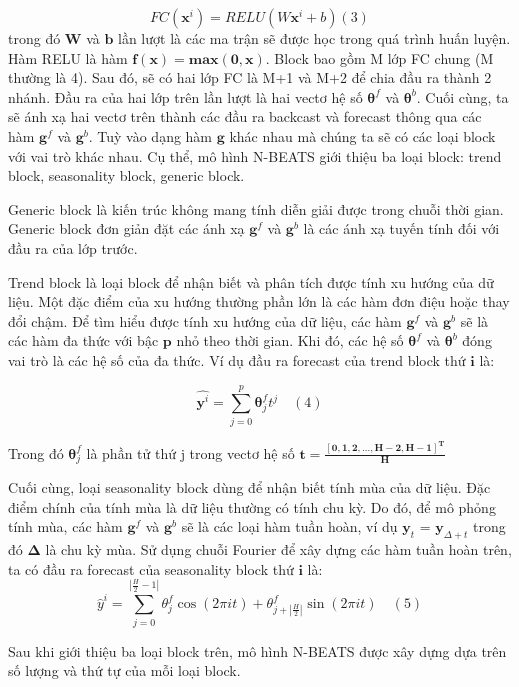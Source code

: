 \documentclass[conference]{IEEEtran}
\begin{document}
\[
    FC(\mathbf{x}^i) = RELU(W\mathbf{x}^i + b) (3)
\]
trong đó $\mathbf{W}$ và $\mathbf{b}$ lần lượt là các ma trận sẽ được học trong quá trình huấn luyện. Hàm RELU là hàm $\mathbf{f(x) = max(0, x)}$.
Block bao gồm M lớp FC chung (M thường là 4). Sau đó, sẽ có hai lớp FC là M+1 và M+2 để chia đầu ra thành 2 nhánh. Đầu ra của hai lớp trên lần lượt là hai vectơ hệ số $\mathbf{\theta}^f$ và $\mathbf{\theta}^b$.
Cuối cùng, ta sẽ ánh xạ hai vectơ trên thành các đầu ra backcast và forecast thông qua các hàm $\mathbf{g}^f$ và $\mathbf{g}^b$. Tuỳ vào dạng hàm $\mathbf{g}$ khác nhau mà chúng ta sẽ có các loại block với vai trò khác nhau. Cụ thể, mô hình N-BEATS giới thiệu ba loại block: trend block, seasonality block, generic block.

Generic block là kiến trúc không mang tính diễn giải được trong chuỗi thời gian. Generic block đơn giản đặt các ánh xạ $\mathbf{g}^f$ và $\mathbf{g}^b$ là các ánh xạ tuyến tính đối với đầu ra của lớp trước.

Trend block là loại block để nhận biết và phân tích được tính xu hướng của dữ liệu. Một đặc điểm của xu hướng thường phần lớn là các hàm đơn điệu hoặc thay đổi chậm. Để tìm hiểu được tính xu hướng
của dữ liệu, các hàm $\mathbf{g}^f$ và $\mathbf{g}^b$ sẽ là các hàm đa thức với bậc $\mathbf{p}$ nhỏ theo thời gian. Khi đó, các hệ số $\mathbf{\theta}^f$ và $\mathbf{\theta}^b$ đóng vai trò là các hệ số của đa thức. Ví dụ đầu ra forecast của trend block thứ $\mathbf{i}$ là:


\[
    \hat{\mathbf{y}^i} = \sum_{j=0}^{p} {\mathbf{\theta}}^f_j{t^j} \quad (4)
\]

Trong đó $\mathbf{\theta}^f_j$ là phần tử thứ j trong vectơ hệ số $\mathbf{t} = \mathbf{\frac{[0, 1, 2, \dots, H-2, H-1]^T}{\mathbf{H}}}$

Cuối cùng, loại seasonality block dùng để nhận biết tính mùa của dữ liệu. Đặc điểm chính của tính mùa là dữ liệu thường có tính chu kỳ.
Do đó, để mô phỏng tính mùa, các hàm $\mathbf{g}^f$ và $\mathbf{g}^b$ sẽ là các loại hàm tuần hoàn, ví dụ $\mathbf{y}_t$ = $\mathbf{y}_{\Delta + t}$ trong đó $\mathbf{\Delta}$ là chu kỳ mùa. Sử dụng chuỗi Fourier để xây dựng các hàm tuần hoàn trên, ta có đầu ra
forecast của seasonality block thứ $\mathbf{i}$ là:
\[
    \hat{y}^i = \sum_{j=0}^{|\frac{H}{2} - 1|} \theta_j^f \cos(2\pi i t) + \theta_{j+|\frac{H}{2}|}^f \sin(2\pi i t) \quad (5)
\]

Sau khi giới thiệu ba loại block trên, mô hình N-BEATS được xây dựng dựa trên số lượng và thứ tự của mỗi loại block.
\end{document}
